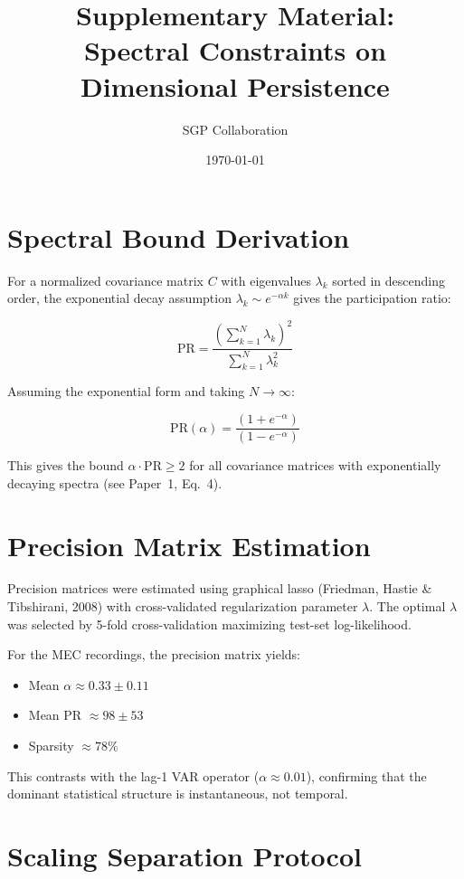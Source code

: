 \documentclass[aps,prx,onecolumn,twoside,showpacs,superscriptaddress]{revtex4-2}
\begin{document}
\title{Supplementary Material: \\ Spectral Constraints on Dimensional Persistence}
\author{SGP Collaboration}
\date{\today}

\maketitle

\section{Spectral Bound Derivation}

For a normalized covariance matrix $C$ with eigenvalues $\lambda_k$ sorted in
descending order, the exponential decay assumption $\lambda_k \sim e^{-\alpha k}$
gives the participation ratio:

\[
\mathrm{PR} = \frac{\left(\sum_{k=1}^N \lambda_k\right)^2}{\sum_{k=1}^N \lambda_k^2}
\]

Assuming the exponential form and taking $N \to \infty$:

\[
\mathrm{PR}(\alpha) = \frac{(1 + e^{-\alpha})}{(1 - e^{-\alpha})}
\]

This gives the bound $\alpha \cdot \mathrm{PR} \geq 2$ for all covariance matrices
with exponentially decaying spectra (see Paper~1, Eq.~4).

\section{Precision Matrix Estimation}

Precision matrices were estimated using graphical lasso
(Friedman, Hastie \& Tibshirani, 2008) with cross-validated regularization
parameter $\lambda$. The optimal $\lambda$ was selected by 5-fold cross-validation
maximizing test-set log-likelihood.

For the MEC recordings, the precision matrix yields:
\begin{itemize}
  \item Mean $\alpha \approx 0.33 \pm 0.11$
  \item Mean PR $\approx 98 \pm 53$
  \item Sparsity $\approx 78\%$
\end{itemize}
This contrasts with the lag-1 VAR operator ($\alpha \approx 0.01$), confirming that
the dominant statistical structure is instantaneous, not temporal.

\section{Scaling Separation Protocol}
\end{document}
